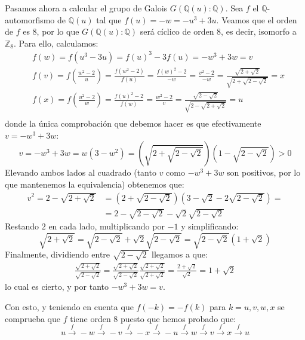 Pasamos ahora a calcular el grupo de Galois $G(\mathbb{Q}(u):\mathbb{Q})$. Sea $f$ el $\mathbb{Q}$-automorfismo de $\mathbb{Q}(u)$ tal que $f(u) = -w = -u^3+3u$. Veamos que el orden de $f$ es 8, por lo que $G(\mathbb{Q}(u):\mathbb{Q})$ será cíclico de orden 8, es decir, isomorfo a $\mathbb{Z}_8$. Para ello, calculamos:
\begin{equation*}
\begin{split}
& f(w) = f\left(u^3-3u\right) = f(u)^3-3f(u) = -w^3+3w = v\\
& f(v) = f\left(\frac{w^2-2}{u}\right) = \frac{f(w^2-2)}{f(u)} = \frac{f(w)^2-2}{-w} = \frac{v^2-2}{-w} = \frac{\sqrt{2+\sqrt{2}}}{\sqrt{2+\sqrt{2-\sqrt{2}}}} = x \\
& f(x) = f\left(\frac{u^2-2}{w}\right) = \frac{f(u)^2-2}{f(w)} = \frac{w^2-2}{v} = \frac{\sqrt{2-\sqrt{2}}}{\sqrt{2-\sqrt{2+\sqrt{2}}}} = u \\
\end{split}
\end{equation*}
donde la única comprobación que debemos hacer es que efectivamente $v=-w^3+3w$:
$$ v = -w^3+3w = w(3-w^2) = \left(\sqrt{2+\sqrt{2-\sqrt{2}}}\right)\left(1-\sqrt{2-\sqrt{2}}\right) > 0 $$
Elevando ambos lados al cuadrado (tanto $v$ como $-w^3+3w$ son positivos, por lo que mantenemos la equivalencia) obtenemos que:
\begin{equation*} 
\begin{split}
	v^2 = 2-\sqrt{2+\sqrt{2}} &= \left(2+\sqrt{2-\sqrt{2}}\right)\left(3-\sqrt{2}-2\sqrt{2-\sqrt{2}}\right) = \\
	                          &= 2- \sqrt{2-\sqrt{2}}-\sqrt{2}\sqrt{2-\sqrt{2}}
\end{split}
\end{equation*}
Restando $2$ en cada lado, multiplicando por $-1$ y simplificando:
$$ \sqrt{2+\sqrt{2}} = \sqrt{2-\sqrt{2}} + \sqrt{2}\sqrt{2-\sqrt{2}} = \sqrt{2-\sqrt{2}}\left(1+\sqrt{2}\right) $$
Finalmente, dividiendo entre $\sqrt{2-\sqrt{2}}$ llegamos a que:
\begin{equation*} 
\begin{split}
	\frac{\sqrt{2+\sqrt{2}}}{\sqrt{2-\sqrt{2}}} = \frac{\sqrt{2+\sqrt{2}}}{\sqrt{2-\sqrt{2}}}\frac{\sqrt{2+\sqrt{2}}}{\sqrt{2+\sqrt{2}}} = \frac{2+\sqrt{2}}{\sqrt{2}} = 1+\sqrt{2}
\end{split}
\end{equation*}
lo cual es cierto, y por tanto $-w^3+3w = v$. 

Con esto, y teniendo en cuenta que $f(-k)=-f(k)$ para $k = u,v,w,x$ se comprueba que $f$ tiene orden 8 puesto que hemos probado que:
\begin{equation*}
	u \xrightarrow{f} -w \xrightarrow{f} -v \xrightarrow{f} -x \xrightarrow{f} -u \xrightarrow{f} w \xrightarrow{f} v \xrightarrow{f} x \xrightarrow{f} u
\end{equation*}

